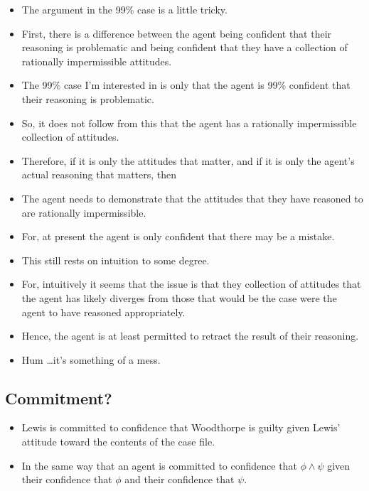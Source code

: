 \documentclass[10pt]{article}
\begin{document}
\begin{itemize}
\item The argument in the 99\% case is a little tricky.
\item First, there is a difference between the agent being confident that their reasoning is problematic and being confident that they have a collection of rationally impermissible attitudes.
\item The 99\% case I'm interested in is only that the agent is 99\% confident that their reasoning is problematic.
\item So, it does not follow from this that the agent has a rationally impermissible collection of attitudes.
\item Therefore, if it is only the attitudes that matter, and if it is only the agent's actual reasoning that matters, then
\item The agent needs to demonstrate that the attitudes that they have reasoned to are rationally impermissible.
\item For, at present the agent is only confident that there may be a mistake.
\end{itemize}

\begin{itemize}
\item This still rests on intuition to some degree.
\item For, intuitively it seems that the issue is that they collection of attitudes that the agent has likely diverges from those that would be the case were the agent to have reasoned appropriately.
\item Hence, the agent is at least permitted to retract the result of their reasoning.
\item Hum \dots it's something of a mess.
\end{itemize}

\subsection{Commitment?}
\label{sec:commitment}

\begin{itemize}
\item Lewis is committed to confidence that Woodthorpe is guilty given Lewis' attitude toward the contents of the case file.
\item In the same way that an agent is committed to confidence that \(\phi \land \psi\) given their confidence that \(\phi\) and their confidence that \(\psi\).
\end{itemize}
\end{document}
